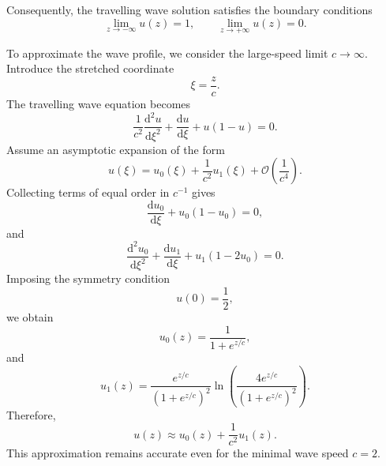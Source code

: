Consequently, the travelling wave solution satisfies the boundary conditions
\begin{equation*}
\lim_{z\to-\infty}u(z)=1,
\qquad
\lim_{z\to+\infty}u(z)=0.
\end{equation*}

To approximate the wave profile, we consider the large-speed limit $c\to\infty$. Introduce the stretched coordinate
\begin{equation*}
\xi = \frac{z}{c}.
\end{equation*}
The travelling wave equation becomes
\begin{equation*}
\frac{1}{c^2}\frac{\mathrm{d}^2u}{\mathrm{d}\xi^2}
+
\frac{\mathrm{d}u}{\mathrm{d}\xi}
+
u(1-u)
=
0.
\end{equation*}
Assume an asymptotic expansion of the form
\begin{equation*}
u(\xi)
=
u_0(\xi)
+
\frac{1}{c^2}u_1(\xi)
+
\mathcal{O}\!\left(\frac{1}{c^4}\right).
\end{equation*}
Collecting terms of equal order in $c^{-1}$ gives
\begin{equation*}
\frac{\mathrm{d}u_0}{\mathrm{d}\xi}
+
u_0(1-u_0)
=
0,
\end{equation*}
and
\begin{equation*}
\frac{\mathrm{d}^2u_0}{\mathrm{d}\xi^2}
+
\frac{\mathrm{d}u_1}{\mathrm{d}\xi}
+
u_1(1-2u_0)
=
0.
\end{equation*}
Imposing the symmetry condition
\begin{equation*}
u(0)=\frac12,
\end{equation*}
we obtain
\begin{equation*}
u_0(z)
=
\frac{1}{1+e^{z/c}},
\end{equation*}
and
\begin{equation*}
u_1(z)
=
\frac{e^{z/c}}
{\left(1+e^{z/c}\right)^2}
\ln\left(
\frac{4e^{z/c}}
{\left(1+e^{z/c}\right)^2}
\right).
\end{equation*}
Therefore,
\begin{equation*}
u(z)
\approx
u_0(z)
+
\frac{1}{c^2}u_1(z).
\end{equation*}
This approximation remains accurate even for the minimal wave speed $c=2$.